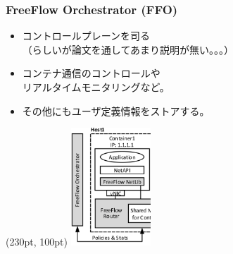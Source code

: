 \documentclass[dvipdfmx,9pt,notheorems]{beamer}
\theoremstyle{definition}
\begin{document}
\begin{frame}\frametitle{FreeFlow Orchestrator (FFO)}
	\begin{itemize}
		\item コントロールプレーンを司る \\
			   （らしいが論文を通してあまり説明が無い。。。）
		\item コンテナ通信のコントロールや \\
			    リアルタイムモニタリングなど。
		\item その他にもユーザ定義情報をストアする。
  \end{itemize}
  \begin{textblock*}{0.4\linewidth} (230pt, 100pt)
  	\centering
  	\includegraphics[width=30mm]{fig/figure4-ffo.png}
  \end{textblock*}
\end{frame}

\end{document}
